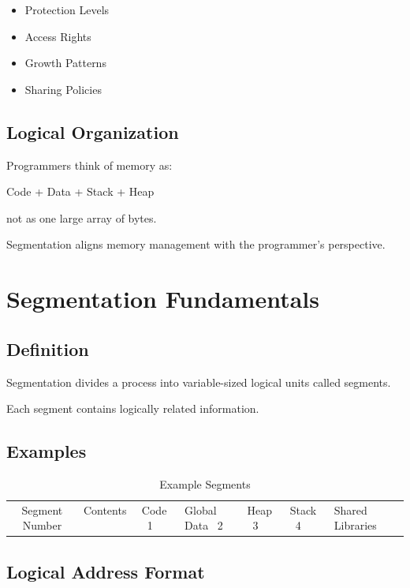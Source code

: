 \begin{itemize}
\item Protection Levels
\item Access Rights
\item Growth Patterns
\item Sharing Policies
\end{itemize}

\subsection{Logical Organization}

Programmers think of memory as:

\begin{center}
Code + Data + Stack + Heap
\end{center}

not as one large array of bytes.

Segmentation aligns memory management with the programmer's perspective.

\section{Segmentation Fundamentals}

\subsection{Definition}

Segmentation divides a process into variable-sized logical units called segments.

Each segment contains logically related information.

\subsection{Examples}

\begin{table}[h]
\centering
\begin{tabular}{|c|l|}
\hline
Segment Number & Contents \
 & Code \
1 & Global Data \
2 & Heap \
3 & Stack \
4 & Shared Libraries \
\hline
\end{tabular}
\caption{Example Segments}
\end{table}

\subsection{Logical Address Format}

